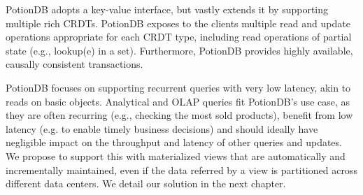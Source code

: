 PotionDB adopts a key-value interface, but vastly extends it by supporting multiple rich CRDTs.
PotionDB exposes to the clients multiple read and update operations appropriate for each CRDT type, including read operations of partial state (e.g., lookup(e) in a set).
Furthermore, PotionDB provides highly available, causally consistent transactions. 

PotionDB focuses on supporting recurrent queries with very low latency, akin to reads on basic objects.
Analytical and OLAP queries fit PotionDB's use case, as they are often recurring (e.g., checking the most sold products), benefit from low latency (e.g. to enable timely business decisions) and should ideally have negligible impact on the throughput and latency of other queries and updates.
We propose to support this with materialized views that are automatically and incrementally maintained, even if the data referred by a view is partitioned across different data centers.
We detail our solution in the next chapter.



